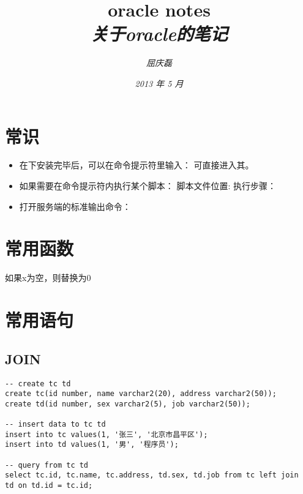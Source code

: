 \documentclass{article}
\begin{document}
\title{%
  {\huge \textsf{oracle notes}\\\smallskip}%
  {\small \textit{关于oracle的笔记}}
}

\author{\textit{屈庆磊}\\[2mm]
       }

\date{\textit{2013 年 5 月}}

\maketitle
\newpage
\begin{multicols}{2}
\tableofcontents
\end{multicols}
\newpage 

\section{常识}
\begin{itemize}
\item[(1)]
在下安装完毕后，可以在命令提示符里输入：
 可直接进入其。

\item[(2)]
如果需要在命令提示符内执行某个脚本：
脚本文件位置:
执行步骤：

\item[(3)]
打开服务端的标准输出命令：
\end{itemize}

\section{常用函数}
 如果x为空，则替换为0

\section{常用语句}
\subsection{JOIN}
\begin{verbatim}
-- create tc td
create tc(id number, name varchar2(20), address varchar2(50));
create td(id number, sex varchar2(5), job varchar2(50));

-- insert data to tc td
insert into tc values(1, '张三', '北京市昌平区');
insert into td values(1, '男', '程序员');

-- query from tc td
select tc.id, tc.name, tc.address, td.sex, td.job from tc left join
td on td.id = tc.id;
\end{verbatim}
\end{document}
